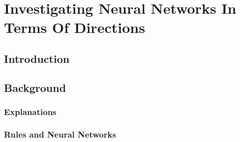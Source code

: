 \chapter{Investigating Neural Networks In Terms Of Directions}\label{chapter5}

\section{Introduction}







\section{Background}

\subsection{Explanations}





\subsection{Rules and Neural Networks}



